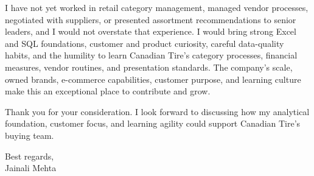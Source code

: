 \documentclass[letterpaper,11pt]{article}
\begin{document}
\bigbreak
I have not yet worked in retail category management, managed vendor processes, negotiated with suppliers, or presented assortment recommendations to senior leaders, and I would not overstate that experience. I would bring strong Excel and SQL foundations, customer and product curiosity, careful data-quality habits, and the humility to learn Canadian Tire's category processes, financial measures, vendor routines, and presentation standards. The company's scale, owned brands, e-commerce capabilities, customer purpose, and learning culture make this an exceptional place to contribute and grow.

\bigbreak
Thank you for your consideration. I look forward to discussing how my analytical foundation, customer focus, and learning agility could support Canadian Tire's buying team.

\bigbreak
Best regards,\\
Jainali Mehta
\end{document}
